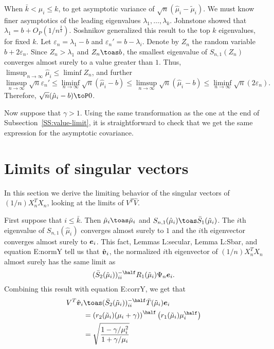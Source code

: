 When $\bar k < \mu_i \leq k$, to get asymptotic variance of
$\sqrt{n} (\hat \mu_i - \tilde \mu_i)$.  We must know finer asymptotics of
the leading eigenvalues $\lambda_1, \ldots, \lambda_k$.  Johnstone
\cite{johnstone2001dle} showed that $\lambda_1 = b + O_P(1/n^\frac{2}{3})$.
Soshnikov \cite{soshnikov2002nud} generalized this result to the top
$k$ eigenvalues, for fixed $k$.  Let $\varepsilon_n = \lambda_1 - b$  and
$\varepsilon_n' = b - \lambda_i$.  Denote by $Z_n$ the random variable
$b + 2 \varepsilon_n$. Since $Z_n > \lambda_1$ and $Z_n \toas b$,
the smallest eigenvalue of $S_{n,1} (Z_n)$ converges almost surely to a
value greater than $1$.  Thus, 
$\limsup_{n\to\infty} \hat \mu_i \leq \liminf Z_n$, and further
\[
    \limsup_{n\to\infty} \sqrt{n} \varepsilon_n'
    \leq
    \liminf_{n\to\infty} \sqrt{n} (\hat \mu_i - b)
    \leq
    \limsup_{n\to\infty} \sqrt{n} (\hat \mu_i - b)
    \leq
    \liminf_{n\to\infty} \sqrt{n} (2 \varepsilon_n).
\]
Therefore, $\sqrt{n} (\hat \mu_i - b) \toP 0$.

Now suppose that $\gamma > 1$.  Using the same transformation as the one at the end of Subsection~\ref{SS:value-limit}, it is straightforward to 
check that we get the same expression for the asymptotic covariance.

\section{Limits of singular vectors}

In this section we derive the limiting behavior of the singular vectors
of $(1/n) X_n^T X_n$, looking at the limits of $V^T \hat V$.

First suppose that $i \leq \bar k$.  Then $\hat \mu_i \toas \tilde \mu_i$ and
$S_{n,1}(\hat \mu_i) \toas \bar S_1 (\tilde \mu_i)$.  The $i$th eigenvalue
of $S_{n,1} (\hat \mu_i)$ converges almost surely to $1$ and the $i$th
eigenvector converges almost surely to $\boldsymbol{e}_i$.  This fact, 
Lemmas {L:secular}, Lemma {L:Sbar}, and equation {E:normY} 
tell us that $\hat {\boldsymbol{v}}_i$, the normalized $i$th eigenvector of
$(1/n) X_n^T X_n$ almost surely has the same limit as
\[
    (\bar S_2(\tilde \mu_i))_{ii}^{-\half} R_1(\tilde \mu_i) \Psi_n \be_i.
\]
Combining this result with equation {E:corrY}, we get that
\begin{align*}
    V^T \hat \bv_i
        &\toas
        (\bar S_2(\tilde \mu_i))_{ii}^{-\half} \bar T(\tilde \mu_i) \be_i \\
        &= \left( r_2( \tilde \mu_i ) (\mu_i + \gamma )\right)^\half
           \left( r_1( \tilde \mu_i ) \mu_i^\half \right) \\
        &= \sqrt{
                \frac{ 1 - \gamma/\mu_i^2}
                     { 1 + \gamma/\mu_i  }
           }
\end{align*}

